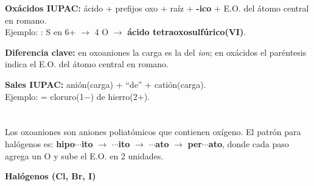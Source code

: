 \textbf{Oxácidos IUPAC:} ácido + prefijos oxo + raíz + \textbf{-ico} + E.O. del átomo central en romano.\\
Ejemplo: : S en 6+ $\to$ 4 O $\to$ \textbf{ácido tetraoxosulfúrico(VI)}.

\textbf{Diferencia clave:} en oxoaniones la carga es la del \textit{ion}; en oxácidos el paréntesis indica el E.O. del átomo central en romano.

\textbf{Sales IUPAC:} anión(carga) + ``de'' + catión(carga).\\
Ejemplo:  = cloruro(1$-$) de hierro(2+).

\newpage

{}
\section*{\centering\fontsize{12}{18}}

Los oxoaniones son aniones poliatómicos que contienen oxígeno. El patrón para halógenos es:
\textbf{hipo$\cdots$ito} $\to$ \textbf{$\cdots$ito} $\to$ \textbf{$\cdots$ato} $\to$ \textbf{per$\cdots$ato},
donde cada paso agrega un O y sube el E.O. en 2 unidades.

\renewcommand{\arraystretch}{1.3}
\setlength{\tabcolsep}{5pt}

\vspace{0.3em}
\textbf{Halógenos ({\color{atomo}Cl, Br, I})}

